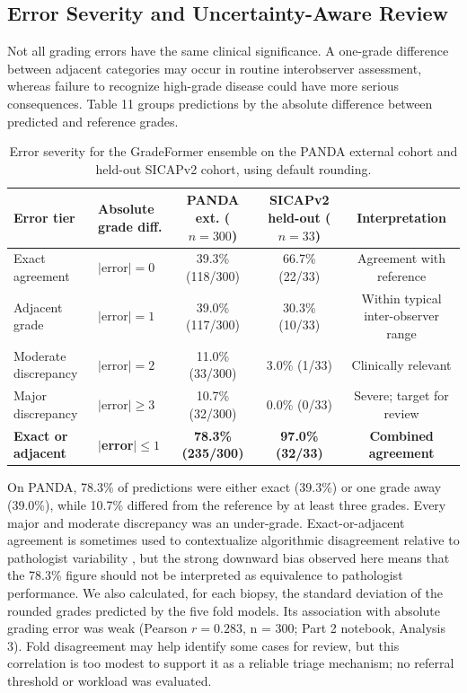 \documentclass[11pt,a4paper]{article}
\begin{document}
\subsection{Error Severity and Uncertainty-Aware Review}
Not all grading errors have the same clinical significance. A one-grade difference between adjacent categories may occur in routine interobserver assessment, whereas failure to recognize high-grade disease could have more serious consequences. Table 11 groups predictions by the absolute difference between predicted and reference grades.


\begin{table}[H]
\centering
\small
\setlength{\tabcolsep}{4pt}
\renewcommand{\arraystretch}{1.15}
\caption{Error severity for the GradeFormer ensemble on the PANDA external cohort and held-out SICAPv2 cohort, using default rounding.}
\label{tab:error_severity}
\begin{tabularx}{\textwidth}{llCCc}
\toprule
\textbf{Error tier} & \textbf{Absolute grade diff.} & \textbf{PANDA ext. ($n = 300$)} & \textbf{SICAPv2 held-out ($n = 33$)} & \textbf{Interpretation} \\
\midrule
Exact agreement & $|$error$| = 0$ & 39.3\% (118/300) & 66.7\% (22/33) & Agreement with reference \\
Adjacent grade & $|$error$| = 1$ & 39.0\% (117/300) & 30.3\% (10/33) & Within typical inter-observer range \\
Moderate discrepancy & $|$error$| = 2$ & 11.0\% (33/300) & 3.0\% (1/33) & Clinically relevant \\
Major discrepancy & $|$error$| \ge 3$ & 10.7\% (32/300) & 0.0\% (0/33) & Severe; target for review \\
\midrule
\textbf{Exact or adjacent} & \textbf{$|$error$| \le 1$} & \textbf{78.3\% (235/300)} & \textbf{97.0\% (32/33)} & \textbf{Combined agreement} \\
\bottomrule
\end{tabularx}
\end{table}

On PANDA, 78.3\% of predictions were either exact (39.3\%) or one grade away (39.0\%), while 10.7\% differed from the reference by at least three grades. Every major and moderate discrepancy was an under-grade. Exact-or-adjacent agreement is sometimes used to contextualize algorithmic disagreement relative to pathologist variability \cite{ref4}, but the strong downward bias observed here means that the 78.3\% figure should not be interpreted as equivalence to pathologist performance. We also calculated, for each biopsy, the standard deviation of the rounded grades predicted by the five fold models. Its association with absolute grading error was weak (Pearson $r = 0.283$, n = 300; Part 2 notebook, Analysis 3). Fold disagreement may help identify some cases for review, but this correlation is too modest to support it as a reliable triage mechanism; no referral threshold or workload was evaluated.
\end{document}
